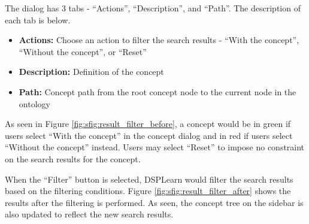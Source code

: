 The dialog has 3 tabs - \enquote{Actions}, \enquote{Description}, and \enquote{Path}. The description of each tab is below.

\begin{itemize}
\item \textbf{Actions:} Choose an action to filter the search results - \enquote{With the concept}, \enquote{Without the concept}, or \enquote{Reset}
\item \textbf{Description:} Definition of the concept
\item \textbf{Path:} Concept path from the root concept node to the current node in the ontology
\end{itemize}

As seen in Figure \ref{fig:sfig:result_filter_before}, a concept would be in green if users select \enquote{With the concept} in the concept dialog and in red if users select \enquote{Without the concept} instead. Users may select \enquote{Reset} to impose no constraint on the search results for the concept.

When the \enquote{Filter} button is selected, DSPLearn would filter the search results based on the filtering conditions. Figure \ref{fig:sfig:result_filter_after} shows the results after the filtering is performed. As seen, the concept tree on the sidebar is also updated to reflect the new search results.

